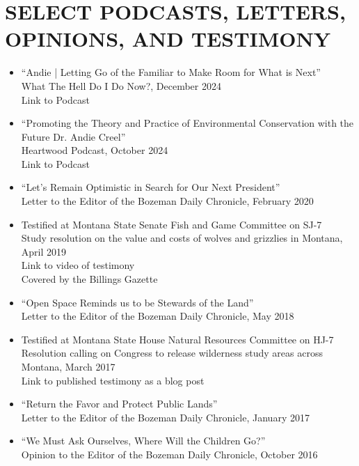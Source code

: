 \documentclass[11pt]{article}
\begin{document}
\section*{SELECT PODCASTS, LETTERS, OPINIONS, AND TESTIMONY}
\begin{itemize}[left=0pt]
    \item “Andie | Letting Go of the Familiar to Make Room for What is Next” \\
    What The Hell Do I Do Now?, December 2024 \\
    Link to Podcast
    \item “Promoting the Theory and Practice of Environmental Conservation with the Future Dr. Andie Creel” \\
    Heartwood Podcast, October 2024 \\
    Link to Podcast
    \item “Let’s Remain Optimistic in Search for Our Next President” \\
    Letter to the Editor of the Bozeman Daily Chronicle, February 2020
    \item Testified at Montana State Senate Fish and Game Committee on SJ-7 \\
    Study resolution on the value and costs of wolves and grizzlies in Montana, April 2019 \\
    Link to video of testimony \\
    Covered by the Billings Gazette
    \item “Open Space Reminds us to be Stewards of the Land” \\
    Letter to the Editor of the Bozeman Daily Chronicle, May 2018
    \item Testified at Montana State House Natural Resources Committee on HJ-7 \\
    Resolution calling on Congress to release wilderness study areas across Montana, March 2017 \\
    Link to published testimony as a blog post
    \item “Return the Favor and Protect Public Lands” \\
    Letter to the Editor of the Bozeman Daily Chronicle, January 2017
    \item “We Must Ask Ourselves, Where Will the Children Go?” \\
    Opinion to the Editor of the Bozeman Daily Chronicle, October 2016
\end{itemize}
\end{document}
